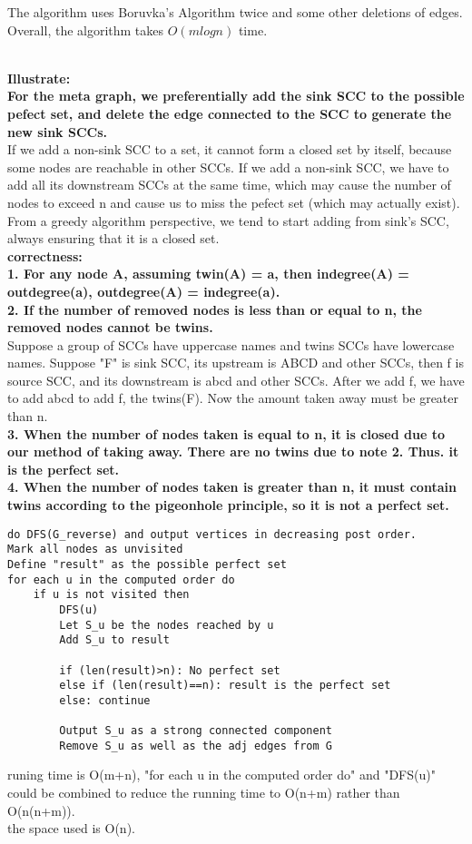 \documentclass[12pt,a4paper]{article}
\newcommand{\question}[1]{\bigskip\noindent{\textbf{Q{#1} solution}}}
\begin{document}
The algorithm uses Boruvka's Algorithm twice and some other deletions of edges. Overall, the algorithm takes $O(mlogn)$ time.

\question{29.B}

\question{29.C}

\question{30}\\
\textbf{Illustrate:}\\
\textbf{For the meta graph, we preferentially add the sink SCC to the possible pefect set, and delete the edge connected to the SCC to generate the new sink SCCs.}\\
If we add a non-sink SCC to a set, it cannot form a closed set by itself, because some nodes are reachable in other SCCs. If we add a non-sink SCC, we have to add all its downstream SCCs at the same time, which may cause the number of nodes to exceed n and cause us to miss the pefect set (which may actually exist). From a greedy algorithm perspective, we tend to start adding from sink's SCC, always ensuring that it is a closed set.\\
\textbf{correctness:}\\
\textbf{1. For any node A, assuming twin(A) = a, then indegree(A) = outdegree(a), outdegree(A) = indegree(a).}\\
\textbf{2. If the number of removed nodes is less than or equal to n, the removed nodes cannot be twins.}\\
Suppose a group of SCCs have uppercase names and twins SCCs have lowercase names. Suppose "F" is sink SCC, its upstream is ABCD and other SCCs, then f is source SCC, and its downstream is abcd and other SCCs. After we add f, we have to add abcd to add f, the twins(F). Now the amount taken away must be greater than n.\\
\textbf{3. When the number of nodes taken is equal to n, it is closed due to our method of taking away. There are no twins due to note 2. Thus. it is the perfect set.}\\
\textbf{4. When the number of nodes taken is greater than n, it must contain twins according to the pigeonhole principle, so it is not a perfect set.}\\
\begin{lstlisting}
do DFS(G_reverse) and output vertices in decreasing post order.
Mark all nodes as unvisited
Define "result" as the possible perfect set
for each u in the computed order do
	if u is not visited then
		DFS(u)
		Let S_u be the nodes reached by u
		Add S_u to result 

		if (len(result)>n): No perfect set
		else if (len(result)==n): result is the perfect set
		else: continue

		Output S_u as a strong connected component
		Remove S_u as well as the adj edges from G
\end{lstlisting}
runing time is O(m+n), "for each u in the computed order do" and "DFS(u)" could be combined to reduce the running time to O(n+m) rather than O(n(n+m)).\\
the space used is O(n).\\
\end{document}

